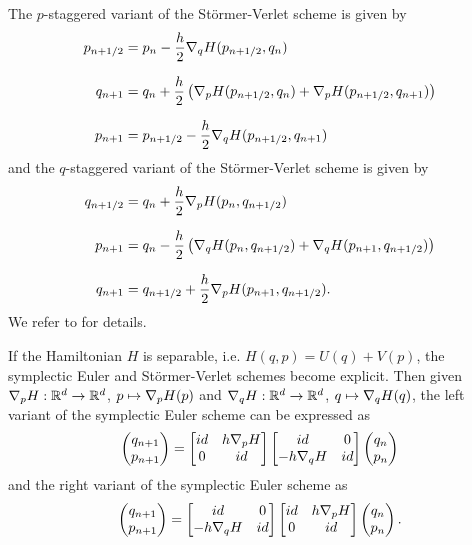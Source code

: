 \documentclass[twoside,a4paper]{article}
\begin{document}
The $p$-staggered variant of the Störmer-Verlet scheme is given by
\begin{align*}
	p_{n+1/2} &= p_n - \frac{h}{2} \grad[q]{H}(p_{n+1/2}, q_n) \\[7pt]
	q_{n+1} &= q_n + \frac{h}{2} \lb \grad[p]{H}(p_{n+1/2}, q_n) + \grad[p]{H}(p_{n+1/2}, q_{n+1}) \rb \\[7pt]
	p_{n+1} &= p_{n+1/2} - \frac{h}{2} \grad[q]{H}(p_{n+1/2}, q_{n+1})
\end{align*}
and the $q$-staggered variant of the Störmer-Verlet scheme is given by
\begin{align*}
	q_{n+1/2} &= q_n + \frac{h}{2} \grad[p]{H}(p_n, q_{n+1/2}) \\[7pt]
	p_{n+1} &= q_n - \frac{h}{2} \lb \grad[q]{H}(p_n, q_{n+1/2}) + \grad[q]{H}(p_{n+1}, q_{n+1/2}) \rb \\[7pt]
	q_{n+1} &= q_{n+1/2} + \frac{h}{2} \grad[p]{H}(p_{n+1}, q_{n+1/2})
	.
\end{align*}
We refer to \citet[p.~189 and p.~190]{hairer2006} for details.

If the Hamiltonian $H$ is separable, i.e. $H(q,p) = U(q) + V(p)$, the symplectic Euler and Störmer-Verlet
schemes become explicit. Then given $\grad[p]{H} : \mathbb{R}^d \to \mathbb{R}^d$, $p \mapsto \grad[p]{H}(p)$ 
and $\grad[q]{H} : \mathbb{R}^d \to \mathbb{R}^d$, $q \mapsto \grad[q]{H}(q)$,
the left variant of the symplectic Euler scheme can be expressed as
\begin{equation*}
	\begin{pmatrix}
		q_{n+1} \\
		p_{n+1}
	\end{pmatrix} =
	\begin{bmatrix}
		id & h \grad[p]{H} \\
		0 & id
	\end{bmatrix} \begin{bmatrix}
		id & 0 \\
		-h \grad[q]{H} & id
	\end{bmatrix}
	\begin{pmatrix}
		q_{n} \\
		p_{n}
	\end{pmatrix} 
\end{equation*}
and the right variant of the symplectic Euler scheme as
\begin{equation*}
	\begin{pmatrix}
		q_{n+1} \\
		p_{n+1}
	\end{pmatrix} =
	\begin{bmatrix}
		id & 0 \\
		-h \grad[q]{H} & id
	\end{bmatrix}
	\begin{bmatrix}
		id & h \grad[p]{H} \\
		0 & id
	\end{bmatrix}
	\begin{pmatrix}
		q_{n} \\
		p_{n}
	\end{pmatrix}
	.
\end{equation*}
\end{document}
